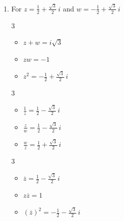 \documentclass{ximera}
\begin{document}
\begin{enumerate}
\begin{multicols}{3}
\begin{itemize}
\item $(\overline{z})^2 = -2+2i\sqrt{3}$

\end{itemize}

\end{multicols}

\item  For   $z = \frac{1}{2} + \frac{\sqrt{3}}{2} \, i$ and $w = -\frac{1}{2} + \frac{\sqrt{3}}{2} \,i$

\begin{multicols}{3}

\begin{itemize}

\item $z+w = i\sqrt{3}$

\item $zw = -1$

\item $z^2 = -\frac{1}{2} + \frac{\sqrt{3}}{2} \,i$

\end{itemize}

\end{multicols}

\begin{multicols}{3}

\begin{itemize}

\item $\frac{1}{z} = \frac{1}{2} - \frac{\sqrt{3}}{2} \, i$

\item $\frac{z}{w} = \frac{1}{2} - \frac{\sqrt{3}}{2} \, i$

\item $\frac{w}{z} = \frac{1}{2} + \frac{\sqrt{3}}{2} \, i$

\end{itemize}

\end{multicols}

\begin{multicols}{3}

\begin{itemize}

\item $\overline{z} = \frac{1}{2} - \frac{\sqrt{3}}{2} \, i$

\item $z\overline{z} = 1$

\item $(\overline{z})^2 = -\frac{1}{2} - \frac{\sqrt{3}}{2} \, i$


\end{itemize}
\end{multicols}
\end{enumerate}
\end{document}
